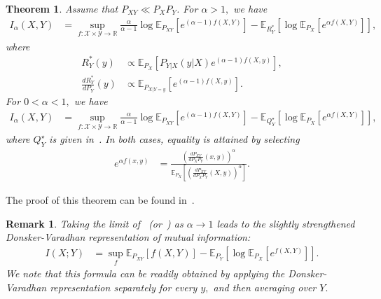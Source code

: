 \documentclass{article}
\newtheorem{theorem}{Theorem}
\numberwithin{theorem}{section}
\numberwithin{example}{section}
\newtheorem{remark}{Remark}
\numberwithin{remark}{section}
\numberwithin{definition}{section}
\newcommand{\E}{\mathbb{E}}
\newcommand{\X}{\mathcal{X}}
\begin{document}
\begin{theorem}\label{thm-Sibson-var-alternative}
Assume that $P_{XY}\ll P_XP_Y$. For $\alpha>1,$ we have 
 \begin{align}
    I_\alpha(X,Y) &= \sup_{f:\X\times\mathcal{Y}\to\mathbb{R}} \frac{\alpha}{\alpha-1} \log \E_{P_{XY}}\left[e^{(\alpha-1)f(X,Y)}\right]- \E_{R_Y^*} \left[\log \E_{P_X}\left[e^{\alpha f(X,Y)}\right]\right] ,\label{thm-Sibson-var-alternative-eq-largealpha}
\end{align}
where
\begin{align}
    R_Y^*(y) &\propto \E_{P_X} \left[ P_{Y|X}(y|X) e^{(\alpha-1)f(X,y)} \right],\label{thm-Sibson-var-alternative-Eq-Rstar}\\
    \frac{dR_Y^*}{dP_Y}(y) &\propto \E_{P_{X|Y=y}} \left[e^{(\alpha-1)f(X,y)} \right].\label{thm-Sibson-var-alternative-Eq-Rstar2}
\end{align}
For $0<\alpha<1,$ we have
\begin{align}
  I_\alpha(X,Y) &= \sup_{f:\X\times\mathcal{Y}\to\mathbb{R}} \frac{\alpha}{\alpha-1} \log \E_{P_{XY}}\left[e^{(\alpha-1) f(X,Y)}\right] - \E_{Q_Y^{\star}} \left[\log \E_{P_X}\left[e^{\alpha f(X,Y)}\right]\right], \label{thm-Sibson-var-alternative-eq-smallalpha}
\end{align}
where $Q_Y^\star$ is given in~.
In both cases, equality is attained by selecting
\begin{align}
    e^{\alpha f(x,y)} & = \frac{\left(\frac{dP_{XY}}{dP_XP_Y}(x,y)\right)^{\alpha}}{\E_{P_{X}}\left[\left(\frac{dP_{XY}}{dP_XP_Y}(X,y)\right)^{\alpha}\right] }. \label{eq:equalityVarRepr}
\end{align}
\end{theorem}

The proof of this theorem can be found in~.

\begin{remark}
    Taking the limit of~ (or~) as $\alpha \rightarrow 1$ leads to the slightly strengthened Donsker-Varadhan representation of mutual information:
\begin{align}
    I(X;Y) & = \sup_f \E_{P_{XY}} [f(X,Y)] - \E_{P_Y} \left[\log \E_{P_X}\left[e^{f(X,Y)}\right]\right].
\end{align}
We note that this formula can be readily obtained by applying the Donsker-Varadhan representation separately for every $y,$ and then averaging over $Y.$
\end{remark}
\end{document}
